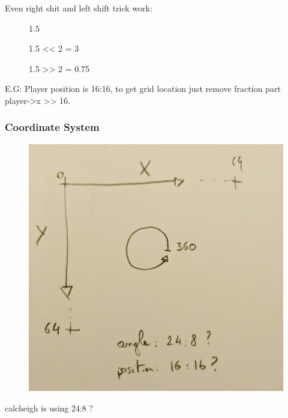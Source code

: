  Even right shit and left shift trick work:\\
 
 \par
\begin{figure}[H]
 \centering
   
   \caption{1.5} 
\end{figure} 

\par
\begin{figure}[H]
 \centering
   
   \caption{1.5 << 2  = 3} 
\end{figure}

\par
\begin{figure}[H]
 \centering
   
   \caption{1.5 >> 2 = 0.75} 
\end{figure}


 

 E.G: Player position is 16:16, to get grid location just remove fraction part player->x >> 16.
 
 


\subsubsection{Coordinate System}
\par
\begin{figure}[H]
  \centering
 \includegraphics[width=\textwidth]{imgs/coordinate_system.png}
\end{figure}
\par
calcheigh is using 24:8 ?


